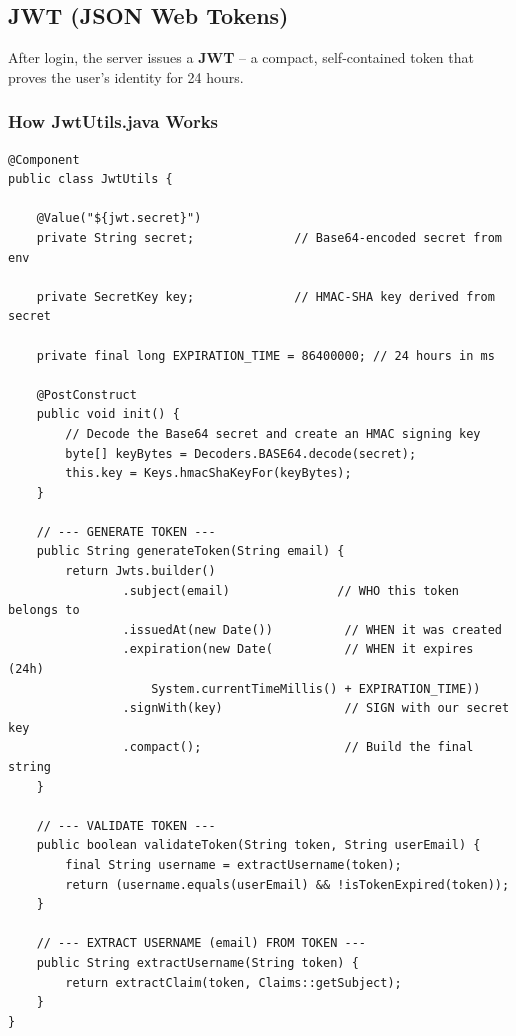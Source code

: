 \documentclass[11pt, a4paper]{article}
\begin{document}
\subsection{JWT (JSON Web Tokens)}

After login, the server issues a \textbf{JWT} -- a compact, self-contained token that proves the user's identity for 24 hours.

\subsubsection{How JwtUtils.java Works}

\begin{lstlisting}[caption={JwtUtils.java -- Token Generation and Validation}]
@Component
public class JwtUtils {

    @Value("${jwt.secret}")
    private String secret;              // Base64-encoded secret from env

    private SecretKey key;              // HMAC-SHA key derived from secret

    private final long EXPIRATION_TIME = 86400000; // 24 hours in ms

    @PostConstruct
    public void init() {
        // Decode the Base64 secret and create an HMAC signing key
        byte[] keyBytes = Decoders.BASE64.decode(secret);
        this.key = Keys.hmacShaKeyFor(keyBytes);
    }

    // --- GENERATE TOKEN ---
    public String generateToken(String email) {
        return Jwts.builder()
                .subject(email)               // WHO this token belongs to
                .issuedAt(new Date())          // WHEN it was created
                .expiration(new Date(          // WHEN it expires (24h)
                    System.currentTimeMillis() + EXPIRATION_TIME))
                .signWith(key)                 // SIGN with our secret key
                .compact();                    // Build the final string
    }

    // --- VALIDATE TOKEN ---
    public boolean validateToken(String token, String userEmail) {
        final String username = extractUsername(token);
        return (username.equals(userEmail) && !isTokenExpired(token));
    }

    // --- EXTRACT USERNAME (email) FROM TOKEN ---
    public String extractUsername(String token) {
        return extractClaim(token, Claims::getSubject);
    }
}
\end{lstlisting}
\end{document}
